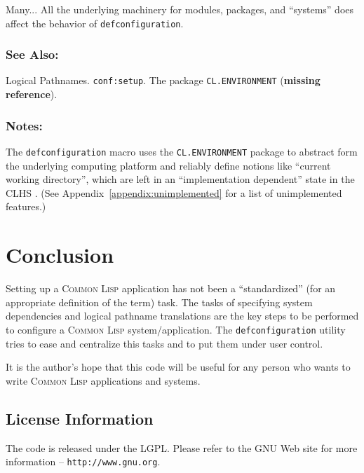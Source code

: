 \documentclass[a4paper]{article}
\newcommand{\CL}{\textsc{Common Lisp}}
\newcommand{\defconfiguration}{\texttt{defconfiguration}}
\newcommand{\code}[1]{\texttt{#1}}
\begin{document}
Many... All the underlying machinery for modules, packages, and
``systems'' does affect the behavior of \defconfiguration{}.

\subsubsection*{See Also:}

Logical Pathnames. \code{conf:setup}. The package
\code{CL.ENVIRONMENT} (\textbf{missing reference}).

\subsubsection*{Notes:}

The \defconfiguration{} macro uses the \code{CL.ENVIRONMENT} package to
abstract form the underlying computing platform and reliably define
notions like ``current working directory'', which are left in an
``implementation dependent'' state in the CLHS
\cite{pitman96:_common_lisp_hyper}.  (See
Appendix~\ref{appendix:unimplemented} for a list of unimplemented
features.)




\section{Conclusion}

Setting up a \CL{} application has not been a ``standardized'' (for an
appropriate definition of the term) task.  The tasks of specifying
system dependencies and logical pathname translations are the key
steps to be performed to configure a \CL{} system/application.  The
\defconfiguration{} utility tries to ease and centralize this tasks
and to put them under user control.

It is the author's hope that this code will be useful for any person
who wants to write \CL{} applications and systems.


\subsection{License Information}

The code is released under the LGPL.  Please refer to the GNU Web site
for more information -- \texttt{http://www.gnu.org}.
\end{document}
